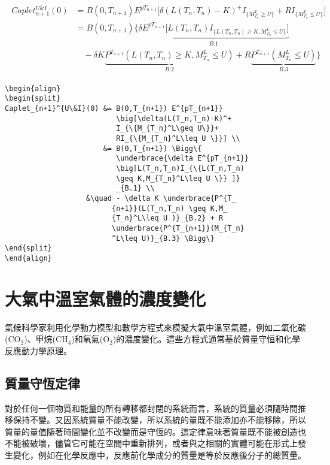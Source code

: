 \documentclass[12pt, a4paper]{article}
\begin{document}
\begin{align}
\begin{split}
Caplet_{n+1}^{U\&I}(0) &= B(0,T_{n+1}) E^{pT_{n+1}} \big[\delta(L(T_n,T_n)-K)^+I_{\{M_{T_n}^L\geq U\}}+ RI_{\{M_{T_n}^L\leq U \}}] \\
                       &= B(0,T_{n+1}) \Bigg\{ \underbrace{\delta E^{pT_{n+1}} \big[L(T_n,T_n)I_{\{L(T_n,T_n) \geq K,M_{T_n}^L\leq U \}} ]}_{B.1} \\
                       &\quad - \delta K \underbrace{P^{T_{n+1}}(L(T_n,T_n) \geq K,M_{T_n}^L\leq U )}_{B.2} + R \underbrace{P^{T_{n+1}}(M_{T_n}^L\leq U)}_{B.3} \Bigg\}
\end{split}
\end{align}
\begin{lstlisting}
\begin{align}
\begin{split}
Caplet_{n+1}^{U\&I}(0) &= B(0,T_{n+1}) E^{pT_{n+1}}
                          \big[\delta(L(T_n,T_n)-K)^+
                          I_{\{M_{T_n}^L\geq U\}}+
                          RI_{\{M_{T_n}^L\leq U \}}] \\
                       &= B(0,T_{n+1}) \Bigg\{
                          \underbrace{\delta E^{pT_{n+1}}
                          \big[L(T_n,T_n)I_{\{L(T_n,T_n)
                          \geq K,M_{T_n}^L\leq U \}} ]}
                          _{B.1} \\
                   &\quad - \delta K \underbrace{P^{T_
                         {n+1}}(L(T_n,T_n) \geq K,M_
                         {T_n}^L\leq U )}_{B.2} + R
                         \underbrace{P^{T_{n+1}}(M_{T_n}
                         ^L\leq U)}_{B.3} \Bigg\}
\end{split}
\end{align}
\end{lstlisting}



\section{大氣中溫室氣體的濃度變化}
氣候科學家利用化學動力模型和數學方程式來模擬大氣中溫室氣體，例如二氧化碳($\mathrm{CO_2}$)、甲烷($\mathrm{CH_4}$)和氧氣($\mathrm{O_2}$)的濃度變化。這些方程式通常基於質量守恒和化學反應動力學原理。

\subsection{質量守恆定律}
對於任何一個物質和能量的所有轉移都封閉的系統而言，{\K 系統的質量必須隨時間推移保持不變}。又因系統質量不能改變，所以系統的量既不能添加亦不能移除，所以質量的量值隨著時間變化並不改變而是守恆的。這定律意味著質量既不能被創造也不能被破壞，儘管它可能在空間中重新排列，或者與之相關的實體可能在形式上發生變化，例如在化學反應中，{\K 反應前化學成分的質量是等於反應後分子的總質量}。
\end{document}
